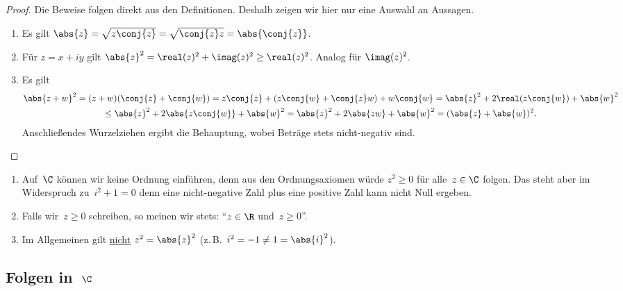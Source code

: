 \documentclass[a4paper]{article}
\begin{document}
\begin{proof}
    Die Beweise folgen direkt aus den Definitionen. Deshalb zeigen wir hier nur eine Auswahl an Aussagen.
    \begin{enumerate}[start=2]
        \item Es gilt $\abs{z} = \sqrt{z\conj{z}} = \sqrt{\conj{z}z} = \abs{\conj{z}}$.
        \item Für $z = x+iy$ gilt $\abs{z}^2 = \real(z)^2 + \imag(z)^2 \geq \real(z)^2$. Analog für $\imag(z)^2$.
        \item Es gilt
              \begin{multline*}
                  \abs{z+w}^2 = (z+w)(\conj{z}+\conj{w}) = z\conj{z} + (z\conj{w} + \conj{z}w) + w\conj{w} = \abs{z}^2 + 2\real(z\conj{w}) + \abs{w}^2 \\
                  \leq \abs{z}^2 + 2\abs{z\conj{w}} + \abs{w}^2 = \abs{z}^2 + 2\abs{zw} + \abs{w}^2 = (\abs{z}+\abs{w})^2.
              \end{multline*}
              Anschließendes Wurzelziehen ergibt die Behauptung, wobei Beträge stets nicht-negativ sind.\qedhere
    \end{enumerate}
\end{proof}


\begin{remark}\leavevmode
    \begin{enumerate}
        \item Auf~$\C$ können wir keine Ordnung einführen, denn aus den Ordnungsaxiomen würde $z^2 \geq 0$ für alle~$z \in \C$ folgen. Das steht aber im Widerspruch zu~$i^2+1 = 0$ denn eine nicht-negative Zahl plus eine positive Zahl kann nicht Null ergeben.
        \item Falls wir~$z \geq 0$ schreiben, so meinen wir stets: "`$z \in \R$ und~$z \geq 0$"'.
        \item Im Allgemeinen gilt \underline{nicht} $z^2 = \abs{z}^2$ (z.\,B.\ $i^2 = -1 \neq 1 = \abs{i}^2$).
    \end{enumerate}
\end{remark}

\subsection{Folgen in~\texorpdfstring{$\C$}{C}}
\end{document}
